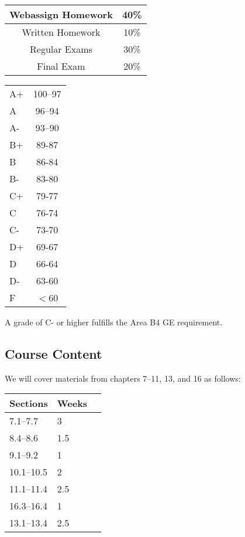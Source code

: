 \documentclass[letterpaper,12pt,fleqn]{article}
\begin{document}
\begin{minipage}{3in}
  \begin{tabular}{|c|c|}
    \hline
    Webassign Homework & 40\% \\
    \hline
    Written Homework & 10\% \\
    \hline
    Regular Exams & 30\% \\
    \hline
    Final Exam & 20\% \\
    \hline
  \end{tabular}
\end{minipage}
\begin{minipage}{3in}
  \begin{tabular}{|l|c|}
    \hline
    A+ & 100--97 \\
    A & 96--94 \\
    A- & 93--90 \\
    B+ & 89-87 \\
    B & 86-84 \\
    B- & 83-80 \\
    C+ & 79-77 \\
    C & 76-74 \\
    C- & 73-70 \\
    D+ & 69-67 \\
    D & 66-64 \\
    D- & 63-60 \\
    F & \(<\)60 \\
    \hline
  \end{tabular}
\end{minipage}

A grade of C- or higher fulfills the Area B4 GE requirement.

\subsection*{Course Content}

We will cover materials from chapters 7--11, 13, and 16 as follows:

\begin{tabular}{|l|l|c|}
  \hline
  \textbf{Sections} & \textbf{Weeks} \\
  \hline
  7.1--7.7 & 3 \\
  \hline
  8.4--8.6 & 1.5 \\
  \hline
  9.1--9.2 & 1 \\
  \hline
  10.1--10.5 & 2 \\
  \hline
  11.1--11.4 & 2.5 \\
  \hline
  16.3--16.4 & 1 \\
  \hline
  13.1--13.4 & 2.5 \\
  \hline
\end{tabular}
\end{document}
